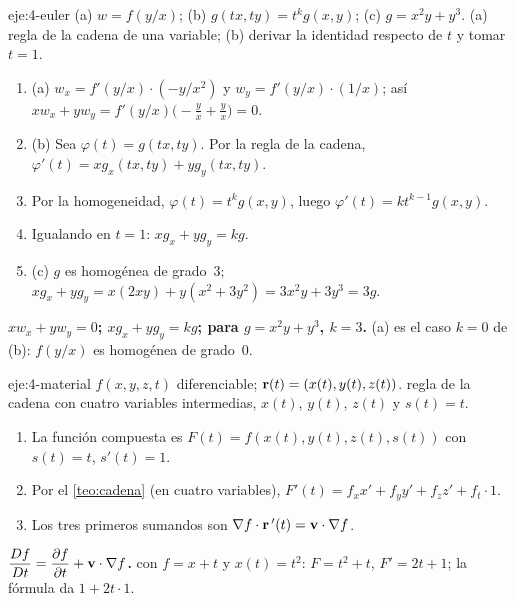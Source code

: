 \begin{solucion}{eje:4-euler}
\datos (a) $w=f(y/x)$; (b) $g(tx,ty)=t^kg(x,y)$; (c) $g=x^2y+y^3$.
\planteamiento (a) regla de la cadena de una variable; (b) derivar la identidad respecto de $t$ y tomar $t=1$.
\pasos
\begin{enumerate}[label=\arabic*.]
  \item (a) $w_x=f'(y/x)\cdot(-y/x^2)$ y $w_y=f'(y/x)\cdot(1/x)$; así $xw_x+yw_y=f'(y/x)\bigl(-\frac yx+\frac yx\bigr)=0$.
  \item (b) Sea $\varphi(t)=g(tx,ty)$. Por la regla de la cadena, $\varphi'(t)=xg_x(tx,ty)+yg_y(tx,ty)$.
  \item Por la homogeneidad, $\varphi(t)=t^kg(x,y)$, luego $\varphi'(t)=kt^{k-1}g(x,y)$.
  \item Igualando en $t=1$: $xg_x+yg_y=kg$.
  \item (c) $g$ es homogénea de grado~3; $xg_x+yg_y=x(2xy)+y(x^2+3y^2)=3x^2y+3y^3=3g$.
\end{enumerate}
\resultado \textbf{$xw_x+yw_y=0$; $xg_x+yg_y=kg$; para $g=x^2y+y^3$, $k=3$.}
\comprobacion (a) es el caso $k=0$ de (b): $f(y/x)$ es homogénea de grado~0.
\end{solucion}

\begin{solucion}{eje:4-material}
\datos $f(x,y,z,t)$ diferenciable; $\mathbf{r}(t)=(x(t),y(t),z(t))$.
\planteamiento regla de la cadena con cuatro variables intermedias, $x(t)$, $y(t)$, $z(t)$ y $s(t)=t$.
\pasos
\begin{enumerate}[label=\arabic*.]
  \item La función compuesta es $F(t)=f(x(t),y(t),z(t),s(t))$ con $s(t)=t$, $s'(t)=1$.
  \item Por el \cref{teo:cadena} (en cuatro variables), $F'(t)=f_xx'+f_yy'+f_zz'+f_t\cdot1$.
  \item Los tres primeros sumandos son $\nabla f\cdot\mathbf{r}\,'(t)=\mathbf{v}\cdot\nabla f$.
\end{enumerate}
\resultado \textbf{$\dfrac{Df}{Dt}=\dfrac{\partial f}{\partial t}+\mathbf{v}\cdot\nabla f$.}
\comprobacion con $f=x+t$ y $x(t)=t^2$: $F=t^2+t$, $F'=2t+1$; la fórmula da $1+2t\cdot1$.
\end{solucion}

